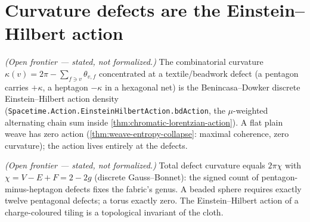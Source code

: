\section{Curvature defects are the Einstein--Hilbert action}

\begin{theorem}\label{thm:curvature-defect-bd-action}\notready{}
\emph{(Open frontier --- stated, not formalized.)} The combinatorial curvature
$\kappa(v) = 2\pi - \sum_{f\ni v}\theta_{v,f}$ concentrated at a textile/beadwork defect
(a pentagon carries $+\kappa$, a heptagon $-\kappa$ in a hexagonal net) is the
Benincasa--Dowker discrete Einstein--Hilbert action density (\texttt{Spacetime.Action.EinsteinHilbertAction.bdAction},
the $\mu$-weighted alternating chain sum inside \cref{thm:chromatic-lorentzian-action}). A
flat plain weave has zero action (\cref{thm:weave-entropy-collapse}: maximal coherence,
zero curvature); the action lives entirely at the defects.
\end{theorem}

\begin{theorem}\label{thm:textile-gauss-bonnet}\notready{}
\emph{(Open frontier --- stated, not formalized.)} Total defect curvature equals
$2\pi\chi$ with $\chi = V - E + F = 2 - 2g$ (discrete Gauss--Bonnet): the signed count of
pentagon-minus-heptagon defects fixes the fabric's genus. A beaded sphere requires exactly
twelve pentagonal defects; a torus exactly zero. The Einstein--Hilbert action of a
charge-coloured tiling is a topological invariant of the cloth.
\end{theorem}

